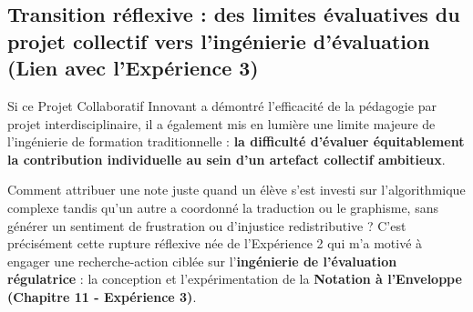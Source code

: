 \subsection{Transition réflexive : des limites évaluatives du projet collectif vers l'ingénierie d'évaluation (Lien avec l'Expérience 3)}

Si ce Projet Collaboratif Innovant a démontré l'efficacité de la pédagogie par projet interdisciplinaire, il a également mis en lumière une limite majeure de l'ingénierie de formation traditionnelle : \textbf{la difficulté d'évaluer équitablement la contribution individuelle au sein d'un artefact collectif ambitieux}. 

Comment attribuer une note juste quand un élève s'est investi sur l'algorithmique complexe tandis qu'un autre a coordonné la traduction ou le graphisme, sans générer un sentiment de frustration ou d'injustice redistributive ? C'est précisément cette rupture réflexive née de l'Expérience 2 qui m'a motivé à engager une recherche-action ciblée sur l'\textbf{ingénierie de l'évaluation régulatrice} : la conception et l'expérimentation de la \textbf{Notation à l'Enveloppe (Chapitre 11 - Expérience 3)}.
